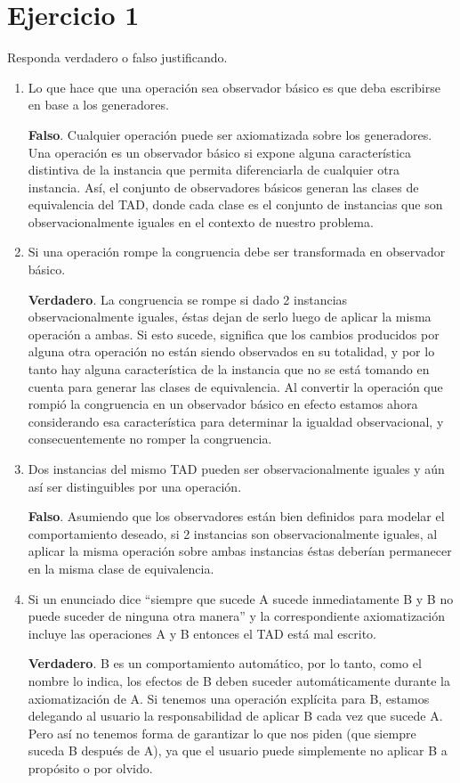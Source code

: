 \section*{Ejercicio 1}

Responda verdadero o falso justificando.

\begin{enumerate}
    \item Lo que hace que una operación sea observador básico es que deba escribirse en base a los generadores.

    \textbf{Falso}. Cualquier operación puede ser axiomatizada sobre los generadores. Una operación es un observador básico si expone alguna característica distintiva de la instancia que permita diferenciarla de cualquier otra instancia. Así, el conjunto de observadores básicos generan las clases de equivalencia del TAD, donde cada clase es el conjunto de instancias que son observacionalmente iguales en el contexto de nuestro problema.

    \item Si una operación rompe la congruencia debe ser transformada en observador básico.

    \textbf{Verdadero}. La congruencia se rompe si dado 2 instancias observacionalmente iguales, éstas dejan de serlo luego de aplicar la misma operación a ambas. Si esto sucede, significa que los cambios producidos por alguna otra operación no están siendo observados en su totalidad, y por lo tanto hay alguna característica de la instancia que no se está tomando en cuenta para generar las clases de equivalencia. Al convertir la operación que rompió la congruencia en un observador básico en efecto estamos ahora considerando esa característica para determinar la igualdad observacional, y consecuentemente no romper la congruencia.

    \item Dos instancias del mismo TAD pueden ser observacionalmente iguales y aún así ser distinguibles por una operación.

    \textbf{Falso}. Asumiendo que los observadores están bien definidos para modelar el comportamiento deseado, si 2 instancias son observacionalmente iguales, al aplicar la misma operación sobre ambas instancias éstas deberían permanecer en la misma clase de equivalencia.

    \item Si un enunciado dice ``siempre que sucede A sucede inmediatamente B y B no puede suceder de ninguna otra manera'' y la correspondiente axiomatización incluye las operaciones A y B entonces el TAD está mal escrito.

    \textbf{Verdadero}. B es un comportamiento automático, por lo tanto, como el nombre lo indica, los efectos de B deben suceder automáticamente durante la axiomatización de A. Si tenemos una operación explícita para B, estamos delegando al usuario la responsabilidad de aplicar B cada vez que sucede A. Pero así no tenemos forma de garantizar lo que nos piden (que siempre suceda B después de A), ya que el usuario puede simplemente no aplicar B a propósito o por olvido.
\end{enumerate}
